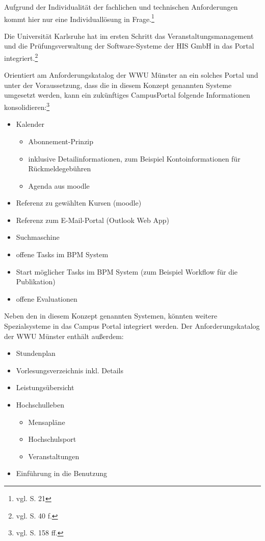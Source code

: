 Aufgrund der Individualität der fachlichen und technischen Anforderungen kommt hier nur eine Individuallösung in Frage.\footnote{vgl. \cite{dini_webportale_2007} S. 21}

Die Universität Karlsruhe hat im ersten Schritt das Veranstaltungsmanagement und die Prüfungsverwaltung der Software-Systeme der HIS GmbH in das Portal integriert.\footnote{vgl. \cite{dini_webportale_2007} S. 40 f.}

Orientiert am Anforderungskatalog der WWU Münster an ein solches Portal und unter der Voraussetzung, dass die in diesem Konzept genannten Systeme umgesetzt werden, kann ein zukünftiges CampusPortal folgende Informationen konsolidieren:\footnote{vgl. \cite{vogl_fortschritte_2012} S. 158 ff.}

\begin{itemize}
	\item Kalender
	\begin{itemize}
		\item Abonnement-Prinzip
		\item inklusive Detailinformationen, zum Beispiel Kontoinformationen für Rückmeldegebühren
		\item Agenda aus moodle
	\end{itemize}
	\item Referenz zu gewählten Kursen (moodle)
	\item Referenz zum E-Mail-Portal (Outlook Web App)
	\item Suchmaschine
	\item offene Tasks im BPM System
	\item Start möglicher Tasks im BPM System (zum Beispiel Workflow für die Publikation)
	\item offene Evaluationen
\end{itemize}

Neben den in diesem Konzept genannten Systemen, könnten weitere Spezialsysteme in das Campus Portal integriert werden. Der Anforderungskatalog der WWU Münster enthält außerdem:

\begin{itemize}
	\item Stundenplan
	\item Vorlesungsverzeichnis inkl. Details
	\item Leistungsübersicht
	\item Hochschulleben
	\begin{itemize}
		\item Mensapläne
		\item Hochschulsport
		\item Veranstaltungen
	\end{itemize}
	\item Einführung in die Benutzung
\end{itemize}

